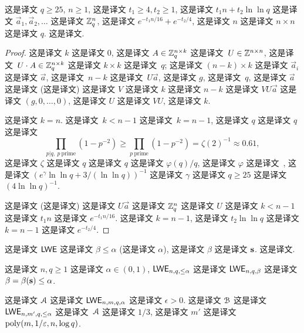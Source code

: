 \begin{claim}\label{clm:invertiblemodq} 这是译文 $q \ge 25$, $n \ge 1$, 这是译文 $t_1 \ge 4, t_2 \ge 1$, 这是译文 $t_1 n+t_2 \ln\ln q$ 这是译文 $\vec{a}_1,\vec{a}_2,\ldots$ 这是译文 $\mathbb{Z}_q^n$, 这是译文 $e^{-t_1 n /16} + e^{-t_2/4}$, 这是译文 $n$ 这是译文 $n \times n$ 这是译文 $q$.  这是译文. 
\end{claim}
\begin{proof}
这是译文 $k$ 这是译文 $0$, 这是译文 $A \in \mathbb{Z}_q^{n \times k}$ 这是译文~$U \in \mathbb{Z}^{n \times n}$,  这是译文~$U \cdot A \in \mathbb{Z}_q^{n \times k}$  这是译文 $k \times k$ 这是译文~$q$; 这是译文 $(n-k) \times
  k$ 这是译文 $\vec{a}_i$ 这是译文 $\vec{a}$, 这是译文~$n-k$ 这是译文~$U
  \vec{a}$, 这是译文 $g$, 这是译文~$q$, 这是译文 $\vec{a}$ 这是译文 (这是译文) 这是译文 $V$ 这是译文 $k$ 这是译文 $n-k$ 这是译文 $VU\vec{a}$ 这是译文 $(g,0,\ldots,0)$,  这是译文 $U$ 这是译文 $VU$, 这是译文 $k$. 

这是译文 $k=n$. 这是译文~$k<n-1$ 这是译文~$k = n-1$, 这是译文 $q$ 这是译文 $q$ 这是译文  \[
\prod_{p|q,~p~\text{prime}} (1-p^{-2}) \ge \prod_{p~\text{prime}} (1-p^{-2}) = \zeta(2)^{-1} \approx 0.61,
\] 这是译文 $\zeta$ 这是译文 $q$ 这是译文 $q$ 这是译文 $\varphi(q)/q$, 这是译文 $\varphi$ 这是译文~\cite[Theorem 8.8.7]{BachShallit},  这是译文 $(e^\gamma \ln \ln q + 3/(\ln\ln q))^{-1}$ 这是译文 $\gamma$ 这是译文 $q \ge 25$ 这是译文 $(4 \ln \ln q)^{-1}$. 

这是译文 (这是译文) 这是译文 $U\vec{a}$ 这是译文 $\mathbb{Z}_q^n$ 这是译文 $U$ 这是译文 $k < n-1$ 这是译文 $t_1 n$ 这是译文 $e^{-t_1 n /16}$. 这是译文 $k=n-1$, 这是译文 $t_2 \ln \ln q$ 这是译文 $k=n-1$ 这是译文 $e^{-t_2/4}$.
\end{proof}



 这是译文 $\mathsf{LWE}$ 这是译文 $\beta \le \alpha$ (这是译文 $\alpha$), 这是译文 $\beta$ 这是译文 $\mathbf{s}$. 这是译文.

\begin{definition}\label{def:lelwe} 这是译文 $n,q \ge 1$ 这是译文 $\alpha \in (0,1)$, $\mathsf{LWE}_{n,q,\le\alpha}$ 这是译文 $\mathsf{LWE}_{n,q,\beta}$ 这是译文 $\beta = \beta(\mathbf{{s}}) \le \alpha$.
\end{definition}

\begin{lemma}\label{lem:lelwe} 这是译文 ${\cal A}$ 这是译文 $\mathsf{LWE}_{n, m, q, \alpha}$ 这是译文 $\epsilon>0$. 这是译文 ${\cal B}$ 这是译文 $\mathsf{LWE}_{n,m',q,\le\alpha}$ 这是译文~${\cal A}$ 这是译文 $1/3$, 这是译文 $m'$ 这是译文 $\operatorname{poly}(m,1/\varepsilon, n, \log q)$.
\end{lemma}

